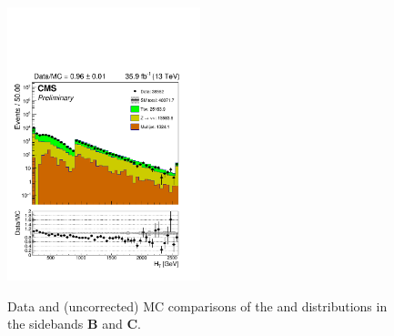 \begin{figure}[!h]
{    \includegraphics[width=0.5\textwidth]{figures/qcd/distributions/bdphisb_ht40}
  }
  \caption{Data and (uncorrected) MC comparisons of the \scalht and \njet
    distributions in the sidebands \textbf{B} and \textbf{C}.}
  \label{fig:qcd_distributions}
\end{figure}

